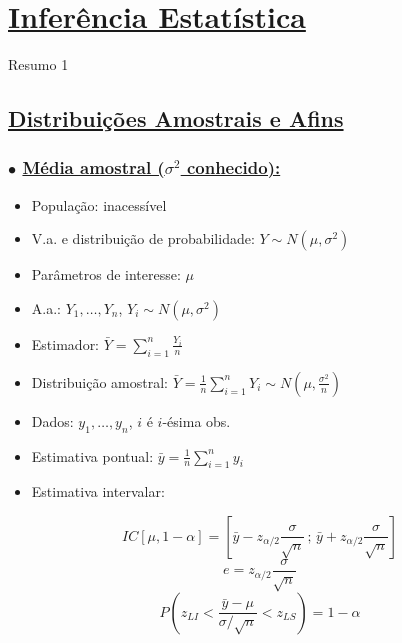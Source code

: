 \documentclass[11pt,a4paper]{article}
\begin{document}
\section*{\underline{Inferência Estatística}}
Resumo 1

\subsection*{\underline{Distribuições Amostrais e Afins}}

\subsubsection*{$\bullet$ \underline{Média amostral ($\sigma^2$ conhecido):}}
\begin{itemize}
  \item População: inacessível
  \item V.a. e distribuição de probabilidade: $Y \sim N(\mu,\sigma^2)$
  \item Parâmetros de interesse: $\mu$
  \item A.a.: $Y_1,\ldots,Y_n$, $Y_i \sim N(\mu,\sigma^2)$
  \item Estimador: $\displaystyle \bar{Y} = \sum_{i=1}^{n}\frac{Y_i}{n}$
  \item Distribuição amostral: $\displaystyle \bar{Y} = \frac{1}{n}\sum_{i=1}^{n} Y_i \sim N\!\left(\mu,\frac{\sigma^2}{n}\right)$
  \item Dados: $y_1,\ldots,y_n$, $i$ é $i$-ésima obs.
  \item Estimativa pontual: $\displaystyle \bar{y} = \frac{1}{n}\sum_{i=1}^{n} y_i$
  \item Estimativa intervalar:
\end{itemize}
\[ IC[\mu,1-\alpha] = \left[\bar{y} - z_{\alpha/2}\frac{\sigma}{\sqrt{n}}\,;\, \bar{y} + z_{\alpha/2}\frac{\sigma}{\sqrt{n}}\right] \]
\[ e = z_{\alpha/2}\frac{\sigma}{\sqrt{n}} \]
\[ P\left(z_{LI} < \frac{\bar{y}-\mu}{\sigma/\sqrt{n}} < z_{LS}\right) = 1-\alpha \]
\end{document}
